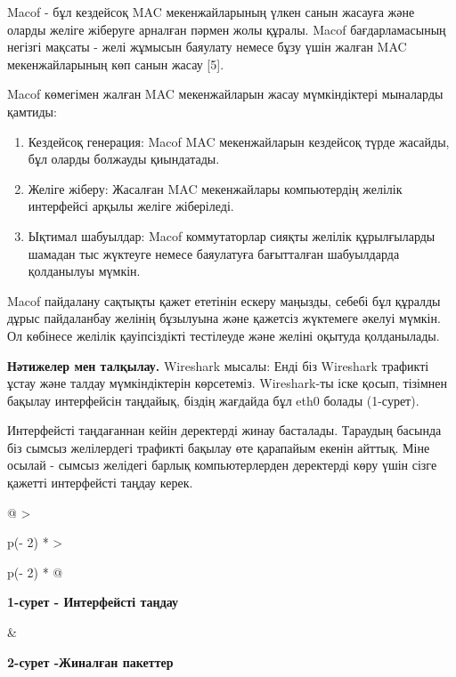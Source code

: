 Macof - бұл кездейсоқ MAC мекенжайларының үлкен санын жасауға және
оларды желіге жіберуге арналған пәрмен жолы құралы. Macof
бағдарламасының негізгі мақсаты - желі жұмысын баяулату немесе бұзу үшін
жалған MAC мекенжайларының көп санын жасау {[}5{]}.

Macof көмегімен жалған MAC мекенжайларын жасау мүмкіндіктері мыналарды
қамтиды:

\begin{enumerate}
\def\labelenumi{\arabic{enumi}.}
\item
  Кездейсоқ генерация: Macof MAC мекенжайларын кездейсоқ түрде жасайды,
  бұл оларды болжауды қиындатады.
\item
  Желіге жіберу: Жасалған MAC мекенжайлары компьютердің желілік
  интерфейсі арқылы желіге жіберіледі.
\item
  Ықтимал шабуылдар: Macof коммутаторлар сияқты желілік құрылғыларды
  шамадан тыс жүктеуге немесе баяулатуға бағытталған шабуылдарда
  қолданылуы мүмкін.
\end{enumerate}

Macof пайдалану сақтықты қажет ететінін ескеру маңызды, себебі бұл
құралды дұрыс пайдаланбау желінің бұзылуына және қажетсіз жүктемеге
әкелуі мүмкін. Ол көбінесе желілік қауіпсіздікті тестілеуде және желіні
оқытуда қолданылады.

{\bfseries Нәтижелер мен талқылау.} Wireshark мысалы: Енді біз Wireshark
трафикті ұстау және талдау мүмкіндіктерін көрсетеміз. Wireshark-ты іске
қосып, тізімнен бақылау интерфейсін таңдайық, біздің жағдайда бұл eth0
болады (1-сурет).

Интерфейсті таңдағаннан кейін деректерді жинау басталады. Тараудың
басында біз сымсыз желілердегі трафикті бақылау өте қарапайым екенін
айттық. Міне осылай - сымсыз желідегі барлық компьютерлерден деректерді
көру үшін сізге қажетті интерфейсті таңдау керек.

\begin{longtable}[]{@{}
  >{\raggedright\arraybackslash}p{(\columnwidth - 2\tabcolsep) * }
  >{\raggedright\arraybackslash}p{(\columnwidth - 2\tabcolsep) * }@{}}
\toprule\noalign{}
\begin{minipage}[b]{\linewidth}\raggedright

{\bfseries 1-сурет - Интерфейсті таңдау}
\end{minipage} & \begin{minipage}[b]{\linewidth}\raggedright

{\bfseries 2-сурет -Жиналған пакеттер}
\end{minipage} \\
\midrule\noalign{}
\endhead
\bottomrule\noalign{}
\endlastfoot
\end{longtable}

